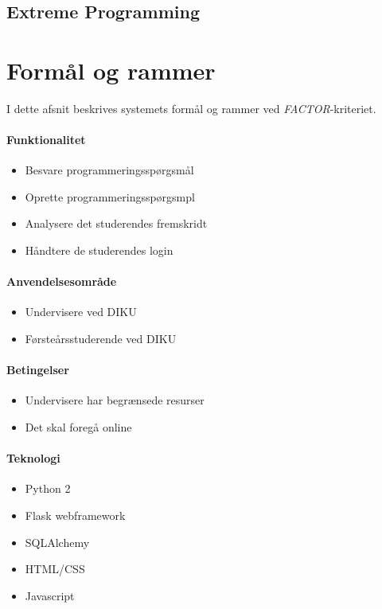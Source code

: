\documentclass[11pt, a4paper]{article}
\begin{document}
\subsection{Extreme Programming}
\label{sub:extreme_programming}



\newpage

\section{Formål og rammer}
\label{sec:formal_og_rammer}
I dette afsnit beskrives systemets formål og rammer ved \textit{FACTOR}-kriteriet.
\paragraph{Funktionalitet}
\begin{itemize}
    \item Besvare programmeringsspørgsmål
    \item Oprette programmeringsspørgsmpl
    \item Analysere det studerendes fremskridt
    \item Håndtere de studerendes login
\end{itemize}
\paragraph{Anvendelsesområde}
\begin{itemize}
    \item Undervisere ved DIKU
    \item Førsteårsstuderende ved DIKU
\end{itemize}
\paragraph{Betingelser}
\begin{itemize}
    \item Undervisere har begrænsede resurser
    \item Det skal foregå online
\end{itemize}
\paragraph{Teknologi}
\begin{itemize}
    \item Python 2
    \item Flask webframework
    \item SQLAlchemy
    \item HTML/CSS
    \item Javascript
\end{itemize}
\end{document}
